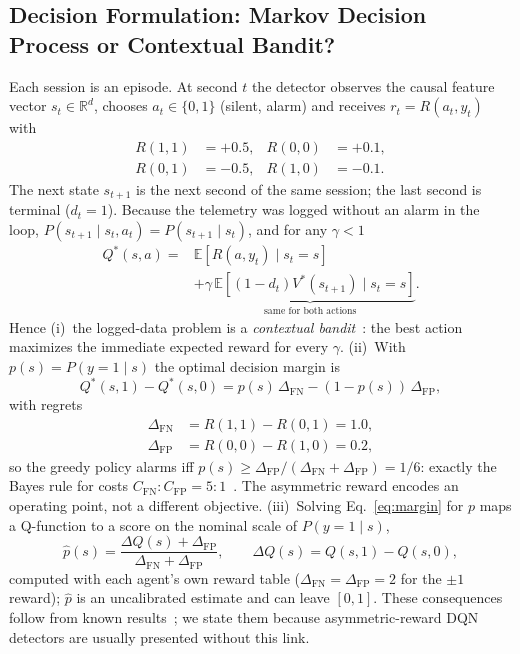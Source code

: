 \subsection{Decision Formulation: Markov Decision Process or Contextual Bandit?}
\label{sec:formulation}
Each session is an episode. At second $t$ the detector observes the causal feature vector $s_t\in\mathbb{R}^d$, chooses $a_t\in\{0,1\}$ (silent, alarm) and receives $r_t=R(a_t,y_t)$ with
\begin{equation}
\begin{aligned}
R(1,1)&=+0.5, & R(0,0)&=+0.1,\\
R(0,1)&=-0.5, & R(1,0)&=-0.1.
\end{aligned}
\label{eq:reward}
\end{equation}
The next state $s_{t+1}$ is the next second of the same session; the last second is terminal ($d_t=1$). Because the telemetry was logged without an alarm in the loop, $P(s_{t+1}\mid s_t,a_t)=P(s_{t+1}\mid s_t)$, and for any $\gamma<1$
\begin{equation}
\begin{aligned}
Q^*(s,a)={}&\mathbb{E}[R(a,y_t)\mid s_t{=}s]\\
&+\underbrace{\gamma\,\mathbb{E}[(1-d_t)V^*(s_{t+1})\mid s_t{=}s]}_{\text{same for both actions}}.
\end{aligned}
\label{eq:decomp}
\end{equation}
Hence (i)~the logged-data problem is a \emph{contextual bandit}~\cite{lattimore2020bandit}: the best action maximizes the immediate expected reward for every $\gamma$. (ii)~With $p(s)=P(y=1\mid s)$ the optimal decision margin is
\begin{equation}
Q^*(s,1)-Q^*(s,0)=p(s)\,\Delta_{\mathrm{FN}}-(1-p(s))\,\Delta_{\mathrm{FP}},
\label{eq:margin}
\end{equation}
with regrets
\begin{equation}
\begin{aligned}
\Delta_{\mathrm{FN}}&=R(1,1)-R(0,1)=1.0,\\
\Delta_{\mathrm{FP}}&=R(0,0)-R(1,0)=0.2,
\end{aligned}
\label{eq:regret}
\end{equation}
so the greedy policy alarms iff $p(s)\ge\Delta_{\mathrm{FP}}/(\Delta_{\mathrm{FN}}+\Delta_{\mathrm{FP}})=1/6$: exactly the Bayes rule for costs $C_{\mathrm{FN}}:C_{\mathrm{FP}}=5:1$~\cite{elkan2001cost}. The asymmetric reward encodes an operating point, not a different objective. (iii)~Solving Eq.~\eqref{eq:margin} for $p$ maps a Q-function to a score on the nominal scale of $P(y=1\mid s)$,
\begin{equation}
\hat p(s)=\frac{\Delta Q(s)+\Delta_{\mathrm{FP}}}{\Delta_{\mathrm{FN}}+\Delta_{\mathrm{FP}}},\qquad \Delta Q(s)=Q(s,1)-Q(s,0),
\label{eq:phat}
\end{equation}
computed with each agent's own reward table ($\Delta_{\mathrm{FN}}=\Delta_{\mathrm{FP}}=2$ for the $\pm1$ reward); $\hat p$ is an uncalibrated estimate and can leave $[0,1]$. These consequences follow from known results~\cite{elkan2001cost,dudik2011efficient}; we state them because asymmetric-reward DQN detectors are usually presented without this link.

